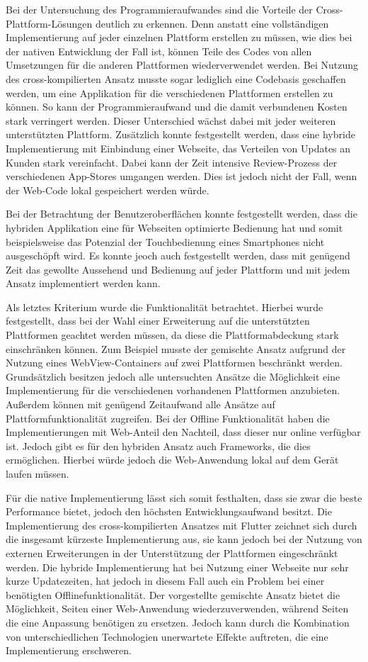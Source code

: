 Bei der Untersuchung des Programmieraufwandes sind die Vorteile der Cross-Plattform-Lösungen deutlich zu erkennen. Denn anstatt eine vollständigen Implementierung auf jeder einzelnen Plattform erstellen zu müssen, wie dies bei der nativen Entwicklung der Fall ist, können Teile des Codes von allen Umsetzungen für die anderen Plattformen wiederverwendet werden. Bei Nutzung des cross-kompilierten Ansatz musste sogar lediglich eine Codebasis geschaffen werden, um eine Applikation für die verschiedenen Plattformen erstellen zu können. So kann der Programmieraufwand und die damit verbundenen Kosten stark verringert werden. Dieser Unterschied wächst dabei mit jeder weiteren unterstützten Plattform.
Zusätzlich konnte festgestellt werden, dass eine hybride Implementierung mit Einbindung einer Webseite, das Verteilen von Updates an Kunden stark vereinfacht. Dabei kann der Zeit intensive Review-Prozess der verschiedenen App-Stores umgangen werden. Dies ist jedoch nicht der Fall, wenn der Web-Code lokal gespeichert werden würde.

Bei der Betrachtung der Benutzeroberflächen konnte festgestellt werden, dass die hybriden Applikation eine für Webseiten optimierte Bedienung hat und somit beispielsweise das Potenzial der Touchbedienung eines Smartphones nicht ausgeschöpft wird. Es konnte jeoch auch festgestellt werden, dass mit genügend Zeit das gewollte Aussehend und Bedienung auf jeder Plattform und mit jedem Ansatz implementiert werden kann.

Als letztes Kriterium wurde die Funktionalität betrachtet. Hierbei wurde festgestellt, dass bei der Wahl einer Erweiterung auf die unterstützten Plattformen geachtet werden müssen, da diese die Plattformabdeckung stark einschränken können. Zum Beispiel musste der gemischte Ansatz aufgrund der Nutzung eines WebView-Containers auf zwei Plattformen beschränkt werden. Grundsätzlich besitzen jedoch alle untersuchten Ansätze die Möglichkeit eine Implementierung für die verschiedenen vorhandenen Plattformen anzubieten. Außerdem können mit genügend Zeitaufwand alle Ansätze auf Plattformfunktionalität  zugreifen. Bei der Offline Funktionalität haben die Implementierungen mit Web-Anteil den Nachteil, dass dieser nur online verfügbar ist. Jedoch gibt es für den hybriden Ansatz auch Frameworks,  die dies ermöglichen. Hierbei würde jedoch die Web-Anwendung lokal auf dem Gerät laufen müssen.

Für die native Implementierung lässt sich somit festhalten, dass sie zwar die beste Performance bietet, jedoch den höchsten Entwicklungsaufwand besitzt.
Die Implementierung des cross-kompilierten Ansatzes mit Flutter zeichnet sich durch die insgesamt kürzeste Implementierung aus, sie kann jedoch bei der Nutzung von externen Erweiterungen in der Unterstützung der Plattformen eingeschränkt werden. Die hybride Implementierung hat bei Nutzung einer Webseite nur sehr kurze Updatezeiten, hat jedoch in diesem Fall auch ein Problem bei einer benötigten Offlinefunktionalität. Der vorgestellte gemischte Ansatz bietet die Möglichkeit, Seiten einer Web-Anwendung wiederzuverwenden, während Seiten die eine Anpassung benötigen zu ersetzen. Jedoch kann durch die Kombination von unterschiedlichen Technologien unerwartete Effekte auftreten, die eine Implementierung erschweren.

